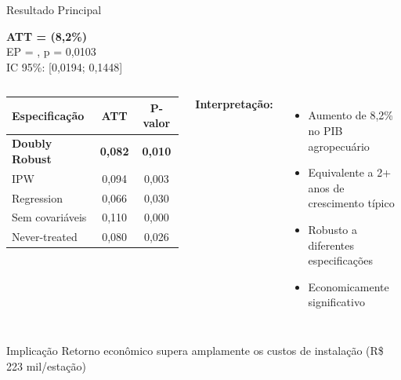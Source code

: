 \documentclass[10pt,aspectratio=169]{beamer}
\begin{document}
\begin{frame}{Resultado Principal}
\begin{center}
\Large
\textbf{ATT = \mainatt{} (8,2\%)}\\
\normalsize
EP = \mainse, p = 0,0103\\
IC 95\%: [0,0194; 0,1448]
\end{center}

\begin{columns}
\begin{table}[h]
\centering
\small
\begin{tabular}{lcc}
\toprule
Especificação & ATT & P-valor \\
\midrule
\textbf{Doubly Robust} & \textbf{0,082} & \textbf{0,010} \\
IPW & 0,094 & 0,003 \\
Regression & 0,066 & 0,030 \\
Sem covariáveis & 0,110 & 0,000 \\
\midrule
Never-treated & 0,080 & 0,026 \\
\bottomrule
\end{tabular}
\end{table}

\textbf{Interpretação:}
\begin{itemize}
    \item Aumento de 8,2\% no PIB agropecuário
    \item Equivalente a 2+ anos de crescimento típico
    \item Robusto a diferentes especificações
    \item Economicamente significativo
\end{itemize}
\end{columns}

\begin{alertblock}{Implicação}
Retorno econômico supera amplamente os custos de instalação (R\$ 223 mil/estação)
\end{alertblock}
\end{frame}
\end{document}
